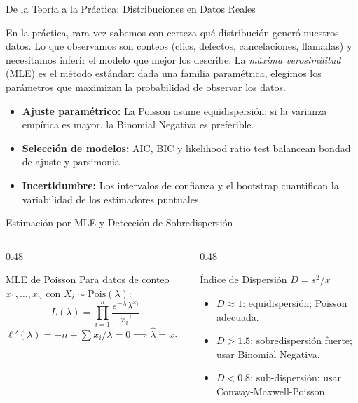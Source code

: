 \documentclass[10pt, aspectratio=169]{beamer}
\begin{document}
\begin{frame}{De la Teoría a la Práctica: Distribuciones en Datos Reales}
  \footnotesize
  \begin{motivacion}
    En la práctica, rara vez sabemos con certeza qué distribución generó nuestros datos. Lo que observamos son conteos (clics, defectos, cancelaciones, llamadas) y necesitamos inferir el modelo que mejor los describe. La \emph{máxima verosimilitud} (MLE) es el método estándar: dada una familia paramétrica, elegimos los parámetros que maximizan la probabilidad de observar los datos.
  \end{motivacion}

  \vspace{0.15cm}
  \pause
  \begin{itemize}\itemsep=0.1cm
    \item \textbf{Ajuste paramétrico:} La Poisson asume equidispersión; si la varianza empírica es mayor, la Binomial Negativa es preferible. \pause
    \item \textbf{Selección de modelos:} AIC, BIC y likelihood ratio test balancean bondad de ajuste y parsimonia. \pause
    \item \textbf{Incertidumbre:} Los intervalos de confianza y el bootstrap cuantifican la variabilidad de los estimadores puntuales.
  \end{itemize}
\end{frame}

\begin{frame}{Estimación por MLE y Detección de Sobredispersión}
  \vspace{-0.15cm}
  \begin{columns}[T]
    \begin{column}{0.48\textwidth}
      \begin{block}{MLE de Poisson}
        \footnotesize
        Para datos de conteo $x_{1}, \dots, x_{n}$ con $X_{i} \sim \text{Pois}(\lambda)$:
        $$L(\lambda) = \prod_{i=1}^{n} \dfrac{e^{-\lambda}\lambda^{x_{i}}}{x_{i}!}$$
        $\ell'(\lambda) = -n + \sum x_{i}/\lambda = 0 \implies \hat{\lambda} = \bar{x}$.
      \end{block}
    \end{column}
    \begin{column}{0.48\textwidth}
      \begin{alertblock}{Índice de Dispersión $D = s^{2}/\bar{x}$}
        \footnotesize
        \begin{itemize}\itemsep=0.04cm
          \item $D \approx 1$: equidispersión; Poisson adecuada.
          \item $D > 1.5$: sobredispersión fuerte; usar Binomial Negativa.
          \item $D < 0.8$: sub-dispersión; usar Conway-Maxwell-Poisson.
        \end{itemize}
      \end{alertblock}
    \end{column}
  \end{columns}
\end{frame}
\end{document}
